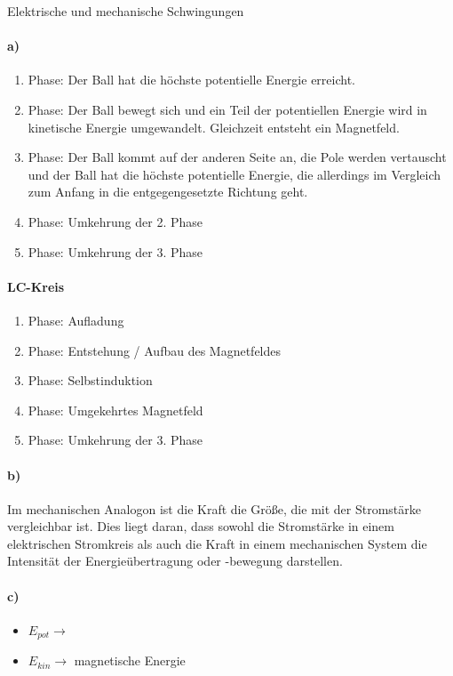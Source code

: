 \documentclass[12pt,a4paper]{report}
\begin{document}
	\noindent
	\Large
	Elektrische und mechanische Schwingungen
	\large
	\noindent
	\paragraph{a)}
	\begin{enumerate}
		\item Phase: Der Ball hat die höchste potentielle Energie erreicht.
		\item Phase: Der Ball bewegt sich und ein Teil der potentiellen Energie wird in kinetische Energie umgewandelt. Gleichzeit entsteht ein Magnetfeld.
		\item Phase: Der Ball kommt auf der anderen Seite an, die Pole werden vertauscht und der Ball hat die höchste potentielle Energie, die allerdings im Vergleich zum Anfang in die entgegengesetzte Richtung geht.
		\item Phase: Umkehrung der 2. Phase
		\item Phase: Umkehrung der 3. Phase
	\end{enumerate}
	\paragraph{LC-Kreis}
	\begin{enumerate}
		\item Phase: Aufladung
		\item Phase: Entstehung / Aufbau des Magnetfeldes
		\item Phase: Selbstinduktion
		\item Phase: Umgekehrtes Magnetfeld
		\item Phase: Umkehrung der 3. Phase
	\end{enumerate}
	\paragraph{b)}
	Im mechanischen Analogon ist die Kraft die Größe, die mit der Stromstärke vergleichbar ist.
	Dies liegt daran, dass sowohl die Stromstärke in einem elektrischen Stromkreis als auch die Kraft in einem mechanischen System die Intensität der Energieübertragung oder -bewegung darstellen.
	\paragraph{c)}
	\begin{itemize}
		\item $E_{pot} \to$ 	
		\item $E_{kin} \to$ magnetische Energie 
	\end{itemize}
\end{document}
